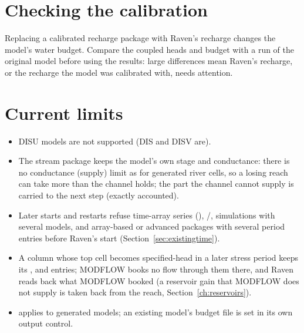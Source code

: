\section{Checking the calibration}
Replacing a calibrated recharge package with Raven's recharge changes the model's water budget. Compare the coupled heads and
budget with a run of the original model before using the results: large differences mean Raven's recharge, or the
recharge the model was calibrated with, needs attention.

\section{Current limits}\label{sec:extlimits}
\begin{itemize}
\item DISU models are not supported (DIS and DISV are).
\item The stream package keeps the model's own stage and conductance: there is no conductance (supply) limit as for generated
river cells, so a losing reach can take more than the channel holds; the part the channel cannot supply is carried to the
next step (exactly accounted).
\item Later starts and restarts refuse time-array series (), /, simulations with several models,
and array-based or advanced packages with several period entries before Raven's start (Section~\ref{sec:existingtime}).
\item A column whose top cell becomes specified-head in a later stress period keeps its ,  and
 entries; MODFLOW books no flow through them there, and Raven reads back what MODFLOW booked (a reservoir gain
that MODFLOW does not supply is taken back from the reach, Section~\ref{ch:reservoirs}).
\item {} applies to generated models; an existing model's budget file is set in its own output control.
\end{itemize}
